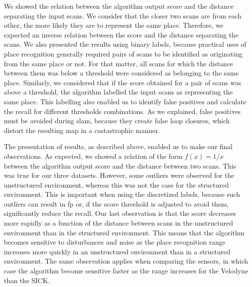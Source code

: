 
We showed the relation between the algorithm output score and the distance separating the input scans. We consider that the closer two scans are from each other, the more likely they are to represent the same place. Therefore, we expected an inverse relation between the score and the distance separating the scans. We also presented the results using binary labels, because practical uses of place recognition generally required pairs of scans to be identified as originating from the same place or not. For that matter, all scans for which the distance between them was below a threshold were considered as belonging to the same place. Similarly, we considered that if the score obtained for a pair of scans was above a threshold, the algorithm labelled the input scans as representing the same place. This labelling also enabled us to identify false positives and calculate the recall for different thresholds combinations. As we explained, false positives must be avoided during \gls*{slam}, because they create false loop closures, which distort the resulting map in a castastrophic manner. 

The presentation of results, as described above, enabled us to make our final observations. As expected, we showed a relation of the form $f(x)=1/x$ between the algorithm output score and the distance between two scans. This was true for our three datasets. However, some outliers were observed for the unstructured environment, whereas this was not the case for the structured environment. This is important when using the discretized labels, because such outliers can result in \gls*{fp} or, if the score threshold is adjusted to avoid them, significantly reduce the recall. Our last observation is that the score decreases more rapidly as a function of the distance between scans in the unstructured environment than in the structured environment. This means that the algorithm becomes sensitive to disturbances and noise as the place recognition range increases more quickly in an unstructured environment than in a structured environment. The same observation applies when comparing the sensors, in which case the algorithm become sensitive faster as the range increases for the Velodyne than the SICK.

